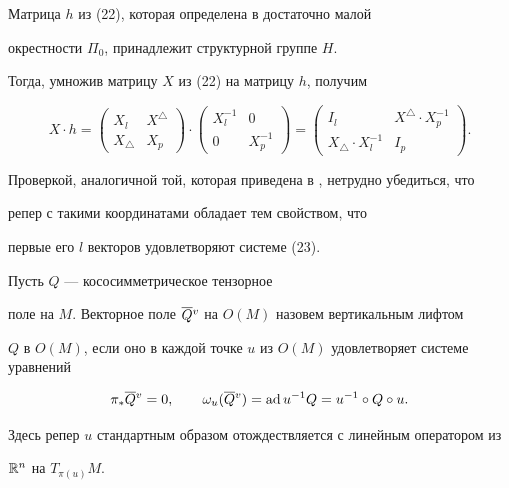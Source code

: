 \begin{pf} Матрица $h$ из (22), которая определена в достаточно малой


окрестности $\Pi_0$, принадлежит структурной группе $H$.


Тогда, умножив матрицу $X$ из (22) на матрицу $h$, получим


$$


X\cdot h=


\begin{pmatrix}


X_l & X^\triangle \\


X_\triangle & X_p


\end{pmatrix}


\cdot


\begin{pmatrix}


X_l^{-1} & 0\\


0 & X_p^{-1}


\end{pmatrix}


=


\begin{pmatrix}


I_l & X^\triangle \cdot X_p^{-1}\\


X_\triangle \cdot X^{-1}_l & I_p


\end{pmatrix}


.


$$


Проверкой, аналогичной той, которая приведена в \cite{Far2}, нетрудно убедиться, что


репер с такими координатами обладает тем свойством, что


первые его $l$ векторов удовлетворяют системе (23).


\end{pf}





\begin{defns} Пусть $Q$ --- кососимметрическое тензорное


поле на $M$. Векторное поле $\overline {Q}{}^v$ на $O(M)$ назовем вертикальным лифтом


$Q$ в $O(M)$, если оно в каждой точке $u$ из $O(M)$ удовлетворяет системе уравнений


\begin{equation}


\pi _*\olv Q=0,\qquad \omega _u(\olv Q)=\ad u^{-1} Q=u^{-1}\circ Q\circ u.


\end{equation}


Здесь репер $u$ стандартным образом отождествляется с линейным оператором из


$\Bbb R^n$ на $T_{\pi (u)}M$.


\end{defns}





